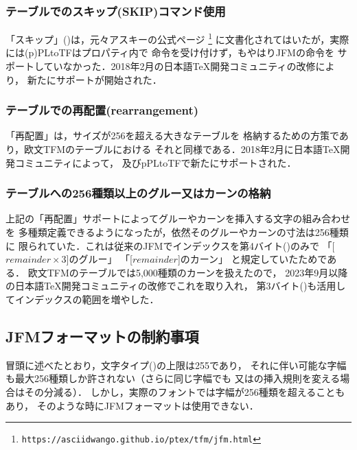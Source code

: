 \documentclass[a4paper,11pt,nomag]{jsarticle}
\def\size#1{\mathit{#1}}
\begin{document}
\subsubsection{テーブルでのスキップ(SKIP)コマンド使用}
「スキップ」()は，元々アスキーの公式ページ
\footnote{\texttt{https://asciidwango.github.io/ptex/tfm/jfm.html}}
に文書化されてはいたが，実際には(p)PLtoTFはプロパティ内で
命令を受け付けず，\pTeX{}もやはりJFMの命令を
サポートしていなかった．2018年2月の日本語\TeX{}開発コミュニティの改修により，
新たにサポートが開始された．

\subsubsection{テーブルでの再配置(rearrangement)}
「再配置」は，サイズが256を超える大きなテーブルを
格納するための方策であり，欧文TFMのテーブルにおける
それと同様である．2018年2月に日本語\TeX{}開発コミュニティによって，
\pTeX{}及びpPLtoTFで新たにサポートされた．

\subsubsection{テーブルへの256種類以上のグルー又はカーンの格納}
上記の「再配置」サポートによってグルーやカーンを挿入する文字の組み合わせを
多種類定義できるようになったが，依然そのグルーやカーンの寸法は256種類に
限られていた．これは従来のJFMでインデックスを第4バイト()のみで
「[$\size{remainder}\times 3$]のグルー」
「[$\size{remainder}$]のカーン」
と規定していたためである．
欧文TFMのテーブルでは5,000種類のカーンを扱えたので，
2023年9月以降の日本語\TeX{}開発コミュニティの改修でこれを取り入れ，
第3バイト()も活用してインデックスの範囲を増やした．

\subsection{JFMフォーマットの制約事項}

冒頭に述べたとおり，文字タイプ()の上限は255であり，
それに伴い可能な字幅も最大256種類しか許されない（さらに同じ字幅でも
又はの挿入規則を変える場合はその分減る）．
しかし，実際のフォントでは字幅が256種類を超えることもあり，
そのような時にJFMフォーマットは使用できない．
\end{document}
